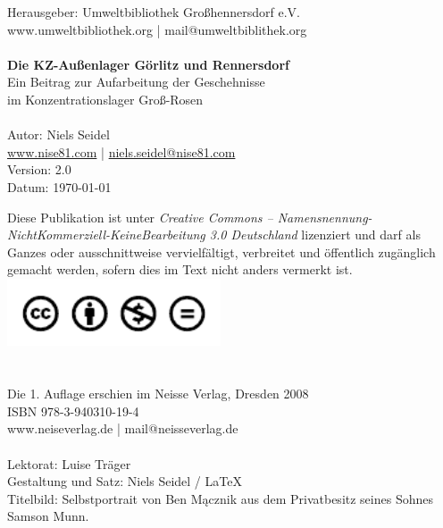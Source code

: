 \documentclass[a4paper,12pt,ngerman,
]{nisebook}
\begin{document}
\small{
Herausgeber: Umweltbibliothek Großhennersdorf e.V.\\
www.umweltbibliothek.org | mail@umweltbiblithek.org
\\ \\
\textbf{Die KZ-Außenlager Görlitz und Rennersdorf}\\
Ein Beitrag zur Aufarbeitung der Geschehnisse\\ im Konzentrationslager Groß-Rosen
\\ \\
Autor: Niels Seidel\\
\href{http://www.nise81.com}{www.nise81.com} | \href{mailto:niels.seidel@nise81.com}{niels.seidel@nise81.com}\\
Version: 2.0\\
Datum: \today\\

\vspace{2.5cm}


Diese Publikation ist unter \emph{Creative Commons -- Namensnennung-NichtKommerziell-KeineBearbeitung 3.0 Deutschland} lizenziert und darf als Ganzes oder ausschnittweise vervielfältigt, verbreitet und öffentlich zugänglich gemacht werden, sofern dies im Text nicht anders vermerkt ist.\newline\vspace{10pt}
\includegraphics[height=20mm]{images/logo_cc.pdf}
\\ \\ \\


Die 1. Auflage erschien im Neisse Verlag, Dresden 2008\\
ISBN 978-3-940310-19-4\\
www.neiseverlag.de | mail@neisseverlag.de\\ \\

Lektorat: Luise Träger\\
Gestaltung und Satz: Niels Seidel / \LaTeX\\
Titelbild: Selbstportrait von Ben Mącznik aus dem Privatbesitz seines Sohnes Samson Munn.\\ \\

}
\normalsize
\newpage
\pagestyle{plain}
\setcounter{page}{5}
\tableofcontents
\newpage
\end{document}

